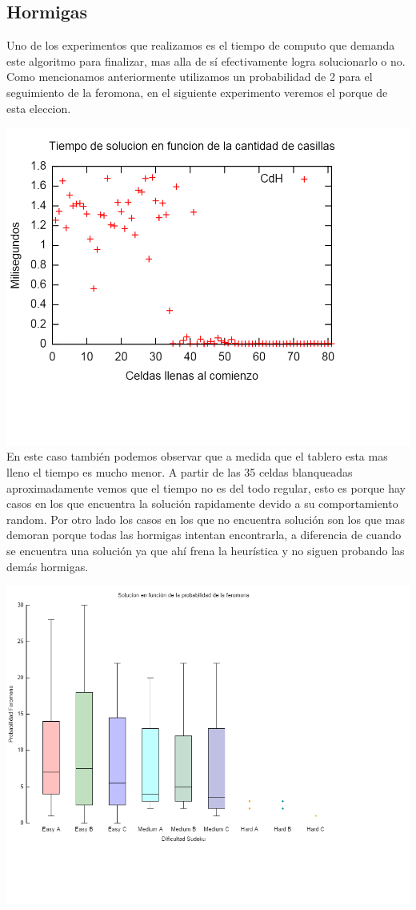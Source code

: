 \subsection{Hormigas}

Uno de los experimentos que realizamos es el tiempo de computo que demanda este algoritmo para finalizar, mas alla de sí efectivamente logra solucionarlo o no. Como mencionamos anteriormente utilizamos un probabilidad de 2 para el seguimiento de la feromona, en el siguiente experimento veremos el porque de esta eleccion.

\includegraphics[scale=0.5]{imgs/resultados_random_hormigas.png}	\\
En este caso también podemos observar que a medida que el tablero esta mas lleno el tiempo es mucho menor. A partir de las 35 celdas blanqueadas aproximadamente vemos que el tiempo no es del todo regular, esto es porque hay casos en los que encuentra la solución rapidamente devido a su comportamiento random. Por otro lado los casos en los que no encuentra solución son los que mas demoran porque todas las hormigas intentan encontrarla, a diferencia de cuando se encuentra una solución ya que ahí frena la heurística y no siguen probando las demás hormigas.


\includegraphics[scale=0.5]{imgs/solucion_hormigas_proba.png}	
